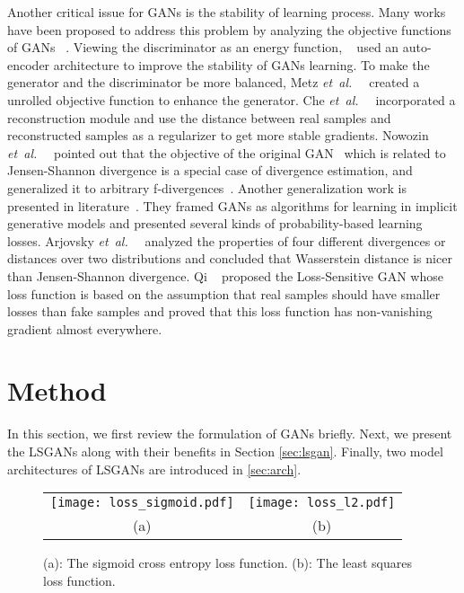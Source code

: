 \documentclass{article} %
\def\etal{{\textit{et~al.~}}}
\begin{document}
Another critical issue for GANs is the stability of learning process. Many works have been proposed to address this problem by analyzing the objective functions of GANs ~\cite{Arjovsky2017,Che2016,Metz2016,Nowozin2016,Qi2016}. Viewing the discriminator as an energy function, ~\cite{Zhao2016} used an auto-encoder architecture to improve the stability of GANs learning. To make the generator and the discriminator be more balanced, Metz \etal~\cite{Metz2016} created a unrolled objective function to enhance the generator. Che \etal~\cite{Che2016} incorporated a reconstruction module and use the distance between real samples and reconstructed samples as a regularizer to get more stable gradients. Nowozin \etal~\cite{Nowozin2016} pointed out that the objective of the original GAN~\cite{Goodfellow2014} which is related to Jensen-Shannon divergence is a special case of divergence estimation, and generalized it to arbitrary f-divergences~\cite{Nguyen2010}. Another generalization work is presented in literature~\cite{Mohamed2016}. They framed GANs as algorithms for learning in implicit generative models and presented several kinds of probability-based learning losses. Arjovsky \etal~\cite{Arjovsky2017} analyzed the properties of four different divergences or distances over two distributions and concluded that Wasserstein distance is nicer than Jensen-Shannon divergence. Qi ~\cite{Qi2016} proposed the Loss-Sensitive GAN whose loss function is based on the assumption that real samples should have smaller losses than fake samples and proved that this loss function has non-vanishing gradient almost everywhere. 



\section{Method}
\label{sec:method}
In this section, we first review the formulation of GANs briefly. Next, we present the LSGANs along with their benefits in Section \ref{sec:lsgan}. Finally, two model architectures of LSGANs are introduced in \ref{sec:arch}.


\begin{figure}[t]
\centering
\begin{tabular}{cc}
 \texttt{[image: loss\_sigmoid.pdf]}
&
 \texttt{[image: loss\_l2.pdf]}
\\
(a)
&
(b)
\end{tabular}
\caption{
(a): The sigmoid cross entropy loss function. (b): The least squares loss function.
}
\label{fig:loss}
\end{figure}
\end{document}
